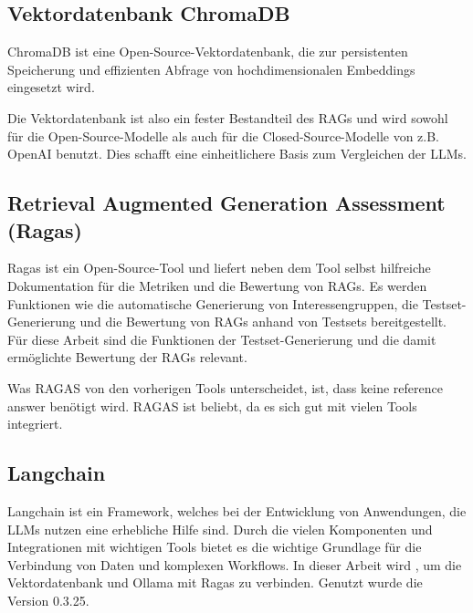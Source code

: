 \subsection{Vektordatenbank ChromaDB \cite{trychroma_2025}}
ChromaDB ist eine Open-Source-Vektordatenbank, die zur persistenten Speicherung und effizienten Abfrage von hochdimensionalen Embeddings eingesetzt wird.

Die Vektordatenbank ist also ein fester Bestandteil des RAGs und wird sowohl für die Open-Source-Modelle als auch für die Closed-Source-Modelle von z.B. OpenAI benutzt. Dies schafft eine einheitlichere Basis zum Vergleichen der LLMs.

\subsection{Retrieval Augmented Generation Assessment (Ragas) \cite{ragas_integrations_2025}}
Ragas ist ein Open-Source-Tool und liefert neben dem Tool selbst hilfreiche Dokumentation für die Metriken und die Bewertung von RAGs.
Es werden Funktionen wie die automatische Generierung von Interessengruppen, die Testset-Generierung und die Bewertung von RAGs anhand von Testsets bereitgestellt.
Für diese Arbeit sind die Funktionen der Testset-Generierung und die damit ermöglichte Bewertung der RAGs relevant.

Was RAGAS von den vorherigen Tools unterscheidet, ist, dass keine \glqq reference answer\grqq{} benötigt wird.
RAGAS ist beliebt, da es sich gut mit vielen Tools integriert.

\subsection{Langchain \cite{langchain_framework}}
Langchain ist ein Framework, welches bei der Entwicklung von Anwendungen, die LLMs nutzen eine erhebliche Hilfe sind.
Durch die vielen Komponenten und Integrationen mit wichtigen Tools bietet es die wichtige Grundlage für die Verbindung von Daten und komplexen Workflows.
In dieser Arbeit wird , um die Vektordatenbank und Ollama mit Ragas zu verbinden. Genutzt wurde die Version 0.3.25.

